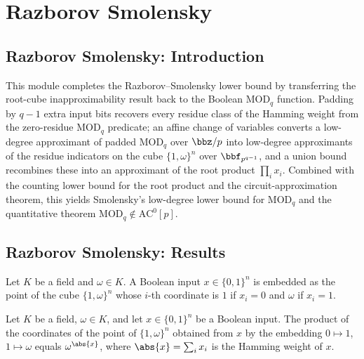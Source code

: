 \section{Razborov Smolensky}
\subsection*{Razborov Smolensky: Introduction}

This module completes the Razborov--Smolensky lower bound by transferring the root-cube
inapproximability result back to the Boolean $\mathrm{MOD}_q$ function.  Padding by $q-1$
extra input bits recovers every residue class of the Hamming weight from the zero-residue
$\mathrm{MOD}_q$ predicate; an affine change of variables converts a low-degree approximant
of padded $\mathrm{MOD}_q$ over $\bbz/p$ into low-degree approximants of the residue
indicators on the cube $\{1,\omega\}^n$ over $\bbf_{p^{q-1}}$, and a union bound recombines
these into an approximant of the root product $\prod_i x_i$.  Combined with the counting
lower bound for the root product and the circuit-approximation theorem, this yields
Smolensky's low-degree lower bound for $\mathrm{MOD}_q$ and the quantitative theorem
$\mathrm{MOD}_q \notin \mathrm{AC}^0[p]$.

\subsection*{Razborov Smolensky: Results}

\begin{definition}
\label{RazborovSmolensky.boolToRootCube}
\leanok
{}
Let $K$ be a field and $\omega \in K$.  A Boolean input $x \in \{0,1\}^n$ is embedded as
the point of the cube $\{1,\omega\}^n$ whose $i$-th coordinate is $1$ if $x_i = 0$ and
$\omega$ if $x_i = 1$.
\end{definition}

\begin{theorem}
\label{RazborovSmolensky.boolToRootCube_rootProduct_eq_weightPow}
\leanok
{}
Let $K$ be a field, $\omega \in K$, and let $x \in \{0,1\}^n$ be a Boolean input.  The
product of the coordinates of the point of $\{1,\omega\}^n$ obtained from $x$ by the
embedding $0 \mapsto 1$, $1 \mapsto \omega$ equals $\omega^{\abs{x}}$, where
$\abs{x} = \sum_i x_i$ is the Hamming weight of $x$.
\end{theorem}

